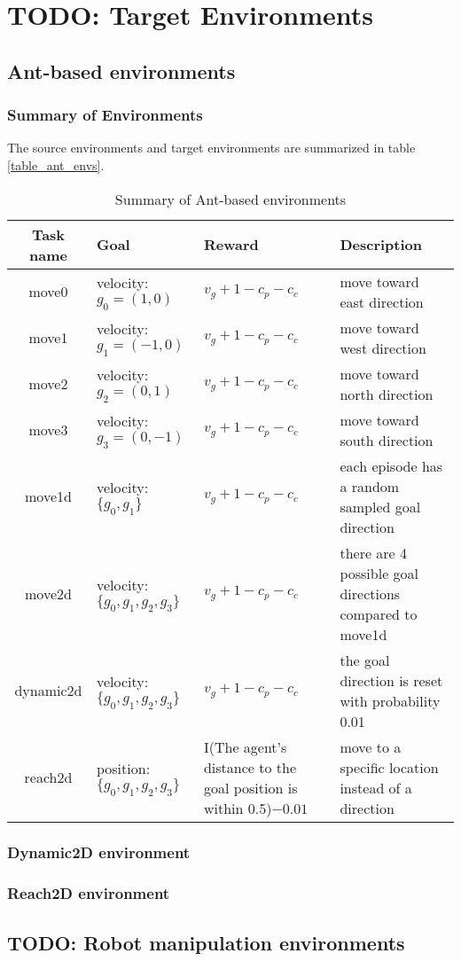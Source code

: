 \section{TODO: Target Environments}\label{sec_env}
\subsection{Ant-based environments}
\subsubsection{Summary of Environments}
The source environments and target environments are summarized in table \ref{table_ant_envs}.


\begin{table}[h]

\begin{center}
\begin{tabular}{|c|p{3cm}|p{4cm}|p{4cm}|}
\hline
Task name & Goal & Reward  &  Description \\
\hline\hline
move0 & velocity: $g_0=(1,0)$ &$ v_g+1-c_p-c_c$  & move toward east direction \\
\hline
move1 & velocity: $g_1=(-1,0)$ &$ v_g+1-c_p-c_c$  & move toward west direction \\
\hline
move2 & velocity: $g_2=(0,1)$ &$ v_g+1-c_p-c_c$  & move toward north direction \\
\hline
move3 & velocity: $g_3=(0,-1)$ &$ v_g+1-c_p-c_c$  & move toward south direction \\ 
\hline 
move1d & velocity: $\{g_0,g_1\}$ &$ v_g+1-c_p-c_c$  & each episode has a random sampled goal direction \\ \hline
move2d & velocity: $\{g_0,g_1,g_2,g_3\}$ &$ v_g+1-c_p-c_c$  & there are 4 possible goal directions compared to move1d \\ \hline
dynamic2d & velocity: $\{g_0,g_1,g_2,g_3\}$ &$ v_g+1-c_p-c_c$  & the goal direction is reset with probability 0.01 \\ \hline
reach2d & position: $\{g_0,g_1,g_2,g_3\}$ & I(The agent's distance to the goal position is within 0.5)$-0.01$  & move to a specific location instead of a direction\\ \hline

\hline
\end{tabular}
\end{center}
 \caption{Summary of Ant-based environments}
\end{table}\label{table_ant_envs}


\subsubsection{Dynamic2D environment}
\subsubsection{Reach2D environment}
\subsection{TODO: Robot manipulation environments}
